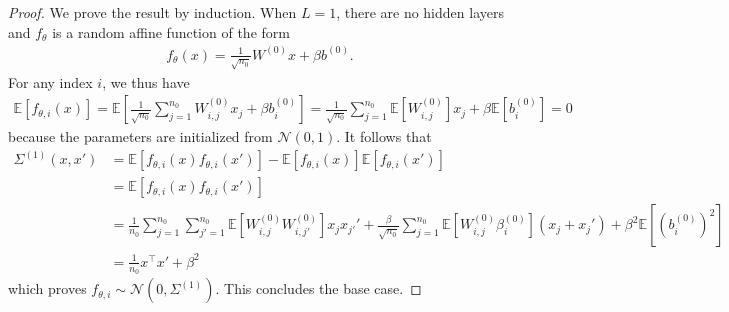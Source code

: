 \documentclass[10pt]{article}
\newcommand{\EE}{\mathbb{E}}
\newcommand{\NN}{\mathcal{N}}
\newcommand{\paran}[1]{{( #1 )}}
\begin{document}
\begin{proof}
We prove the result by induction. When $L = 1$, there are no hidden layers and $f_\theta$ is a random affine function of the form
\begin{align*}
f_\theta(x) = \frac{1}{\sqrt{n_0}} W^\paran{0} x + \beta b^\paran{0}.
\end{align*}
For any index $i$, we thus have
\begin{align*}
\EE[f_{\theta,i}(x)] = \EE \left[ \frac{1}{\sqrt{n_0}} \sum_{j = 1}^{n_0} W^\paran{0}_{i,j} x_j + \beta b^\paran{0}_i \right] = \frac{1}{\sqrt{n_0}} \sum_{j = 1}^{n_0} \EE[ W^\paran{0}_{i,j} ] x_j + \beta \EE[ b^\paran{0}_i ] = 0
\end{align*}
because the parameters are initialized from $\NN(0,1)$. It follows that
\begin{align*}
\Sigma^\paran{1}(x,x') &= \EE[ f_{\theta,i}(x) f_{\theta,i}(x') ] - \EE[f_{\theta,i}(x)] \EE[f_{\theta,i}(x')] \\
&= \EE[ f_{\theta,i}(x) f_{\theta,i}(x') ] \\
&= \frac{1}{n_0} \sum_{j = 1}^{n_0} \sum_{j' = 1}^{n_0} \EE[W^\paran{0}_{i,j} W^\paran{0}_{i,j'}]x_j x_{j'}' + \frac{\beta}{\sqrt{n_0}} \sum_{j = 1}^{n_0} \EE[ W^\paran{0}_{i,j} \beta^\paran{0}_i](x_j + x_j') + \beta^2 \EE[(b^\paran{0}_i)^2] \\
&= \frac{1}{n_0} x^\top x' + \beta^2
\end{align*}
which proves $f_{\theta,i} \sim \NN(0,\Sigma^\paran{1})$. This concludes the base case.


\end{proof}
\end{document}
